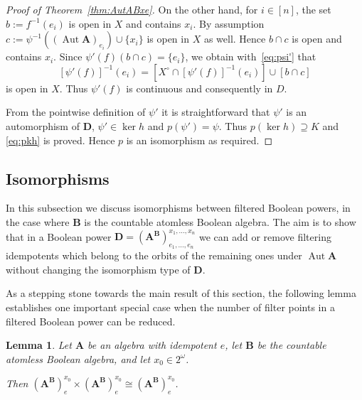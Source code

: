 \documentclass[12pt,a4paper,reqno]{amsart}
\numberwithin{equation}{section}
\theoremstyle{plain}
\newtheorem{lem}[thm]{Lemma}
\theoremstyle{definition}
\newcommand{\A}{\mathbf{A}}
\newcommand{\AB}{\mathbf{A^B}}
\newcommand{\ABxe}{(\mathbf{A^B})^{x_1,\dots,x_n}_{e_1,\dots,e_n}}
\newcommand{\B}{\mathbf{B}}
\newcommand{\D}{\mathbf{D}}
\DeclareMathOperator{\Aut}{Aut}
\begin{document}
\begin{proof}[Proof of Theorem~\ref{thm:AutABxe}]
 On the other hand, for $i\in [n]$, the set $b := f^{-1}(e_i)$ is open in $X$ and contains $x_i$.
 By assumption $c := \psi^{-1}((\Aut\A)_{e_i}) \cup \{x_i\}$ is open in $X$ as well. Hence $b\cap c$ is open and contains
 $x_i$.
 Since $\psi'(f)(b\cap c) = \{e_i\}$, we obtain with~\eqref{eq:psi'} that
\[ [\psi'(f)]^{-1}(e_i) = [X^\circ \cap [\psi'(f)]^{-1}(e_i)] \cup [b\cap c] \]
 is open in $X$.
 Thus $\psi'(f)$ is continuous and consequently in $D$. 

 From the pointwise definition of $\psi'$ it is straightforward that $\psi'$ is an automorphism of $\D$,
 $\psi'\in\ker h$ and $p(\psi') = \psi$.
 Thus $p(\ker h) \supseteq K$ and \eqref{eq:pkh} is proved. Hence $p$ is an isomorphism as required.
\end{proof}




\subsection{Isomorphisms}


In this subsection we discuss isomorphisms between filtered Boolean powers, in the case where $\B$ is the countable atomless Boolean algebra. 
The aim is to show that in a Boolean power $\D=\ABxe$ we can add or remove filtering idempotents which
  belong to the orbits of the remaining ones 
  under $\Aut\A$ without changing the isomorphism type of $\D$.


 As a stepping stone towards the main result of this section, the following lemma establishes one important special case when
the number of filter points in a filtered Boolean power can be reduced.   

\begin{lem}  \label{lem:isoproduct}
  Let $\A$ be an algebra with idempotent $e$,
  let $\B$ be the countable atomless Boolean algebra, and let $x_0\in 2^\omega$.

  Then $(\AB)^{x_0}_{e} \times (\AB)^{x_0}_{e} \cong (\AB)^{x_0}_{e}$.
\end{lem}
\end{document}
